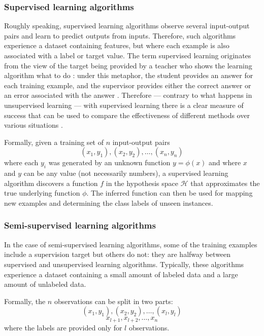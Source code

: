             \subsubsection{Supervised learning algorithms}\label{supervised}
                Roughly speaking, supervised learning algorithms observe several input-output pairs and learn to predict outputs from inputs. Therefore, such algorithms experience a dataset containing features, but where each example is also associated with a label or target value. The term supervised learning originates from the view of the target being provided by a teacher who shows the learning algorithm what to do \cite[105]{Goodfellow}: under this metaphor, the student provides an answer for each training example, and the supervisor provides either the correct answer or an error associated with the answer \cite[485]{Hastie}. Therefore --- contrary to what happens in unsupervised learning --- with supervised learning there is a clear measure of success that can be used to compare the effectiveness of different methods over various situations \cite[486]{Hastie}.
                
                Formally, given a training set of \(n\) input-output pairs
                \[\left(x_{1},y_{1}\right), \left(x_{2},y_{2}\right), \dots, \left(x_{n},y_{n}\right)\]
                where each \(y_{i}\) was generated by an unknown function \(y=\phi\left(x\right)\) and where \(x\) and \(y\) can be any value (not necessarily numbers), a supervised learning algorithm discovers a function \(f\) in the hypothesis space \(\mathcal{H}\) that approximates the true underlying function \(\phi\). The inferred function can then be used for mapping new examples and determining the class labels of unseen instances.
            \subsubsection{Semi-supervised learning algorithms}\label{semi_supervised}
                In the case of semi-supervised learning algorithms, some of the training examples include a supervision target but others do not: they are halfway between supervised and unsupervised learning algorithms. Typically, these algorithms experience a dataset containing a small amount of labeled data and a large amount of unlabeled data.
                
                Formally, the \(n\) observations can be split in two parts:
                \[\left(x_{1},y_{1}\right), \left(x_{2},y_{2}\right), \dots, \left(x_{l},y_{l}\right)\]
                \[x_{l+1}, x_{l+2}, \dots, x_{n}\]
                where the labels are provided only for \(l\) observations.
                
